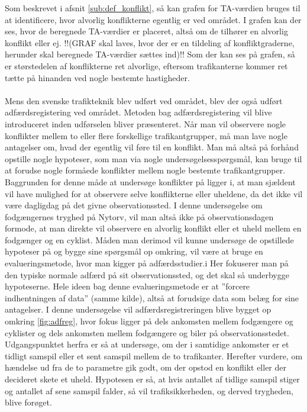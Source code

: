 Som beskrevet i afsnit \cref{sub:def_konflikt}, så kan grafen for TA-værdien bruges til at identificere, hvor alvorlig konflikterne egentlig er ved området. I grafen kan der ses, hvor de beregnede TA-værdier er placeret, altså om de tilhører en alvorlig konflikt eller ej.
!!(GRAF skal laves, hvor der er en tildeling af konfliktgraderne, herunder skal beregnede TA-værdier sættes ind)!!
Som der kan ses på grafen, så er størstedelen af konflikterne ret alvorlige, eftersom trafikanterne kommer ret tætte på hinanden ved nogle bestemte hastigheder.
\\\\
Mens den svenske trafikteknik blev udført ved området, blev der også udført adfærdsregistering ved området. Metoden bag adfærdsregistering vil blive introduceret inden udførselen bliver præsenteret.
Når	man	vil	observere nogle	konflikter mellem to eller flere	forskellige trafikantgrupper,	må man lave	nogle antagelser	om, hvad	 der egentlig vil føre til en konflikt. Man må altså	på	forhånd	opstille nogle hypoteser, som man via nogle undersøgelsesspørgsmål, kan bruge til	at forudse nogle	formåede	konflikter mellem nogle bestemte	trafikantgrupper.	Baggrunden for denne	måde at	undersøge konflikter	på ligger i,	at man sjældent 	vil	have	mulighed	 for at	observere selve konflikterne	eller uheldene, da det ikke	vil	være	 dagligdag på	 det	 givne observationssted.	I denne	undersøgelse om	fodgængernes tryghed på	Nytorv,	vil man altså ikke på observationsdagen formode,	at man direkte vil observere en alvorlig	 konflikt eller	et uheld mellem	en fodgænger og	en cyklist.	Måden man derimod	vil	kunne undersøge	de opstillede hypoteser på og bygge sine	spørgsmål op omkring, vil	være	at bruge en	evalueringsmetode, hvor	man	kigger på adfærdsstudier.i Her fokuserer	man	på den typiske normale adfærd på	sit observationssted, og	det skal så	underbygge	hypoteserne. Hele ideen bag denne evalueringsmetode er at ”forcere indhentningen af data”	(samme	kilde),	altså at forudsige data	som	belæg for sine antagelser.
I denne undersøgelse vil	adfærdsregistreringen blive bygget op omkring	 \cref{fig:adfreg},	hvor fokus ligger på dels ankomsten mellem fodgængere	 og cyklister og dels ankomsten mellem	fodgængere og biler på observationsstedet. Udgangspunktet herfra er så at	undersøge, om	der i samtidige ankomster er	et tidligt samspil eller	et sent samspil mellem de to trafikanter.
Herefter vurdere, om hændelse ud fra	de to parametre gik godt, om	der	opstod en konflikt	eller der decideret skete et	uheld. Hypotesen er	så,	at hvis	antallet	 af	tidlige
samspil stiger og antallet af sene samspil falder, så vil trafiksikkerheden, og derved
trygheden, blive forøget.

